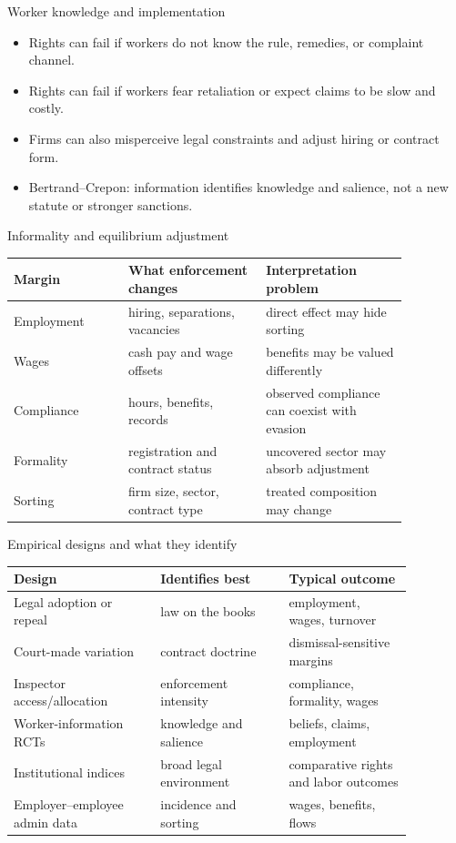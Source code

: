 \documentclass[aspectratio=169,11pt]{beamer}
\begin{document}
\begin{frame}{Worker knowledge and implementation}
\begin{itemize}
    \item Rights can fail if workers do not know the rule, remedies, or complaint channel.
    \item Rights can fail if workers fear retaliation or expect claims to be slow and costly.
    \item Firms can also misperceive legal constraints and adjust hiring or contract form.
    \item Bertrand--Crepon: information identifies knowledge and salience, not a new statute or stronger sanctions.
\end{itemize}
\end{frame}

\begin{frame}{Informality and equilibrium adjustment}
\small
\begin{tabular}{p{0.25\linewidth} p{0.30\linewidth} p{0.31\linewidth}}
\toprule
Margin & What enforcement changes & Interpretation problem \\
\midrule
Employment & hiring, separations, vacancies & direct effect may hide sorting \\
Wages & cash pay and wage offsets & benefits may be valued differently \\
Compliance & hours, benefits, records & observed compliance can coexist with evasion \\
Formality & registration and contract status & uncovered sector may absorb adjustment \\
Sorting & firm size, sector, contract type & treated composition may change \\
\bottomrule
\end{tabular}
\end{frame}

\begin{frame}{Empirical designs and what they identify}
\small
\begin{tabular}{p{0.32\linewidth} p{0.28\linewidth} p{0.27\linewidth}}
\toprule
Design & Identifies best & Typical outcome \\
\midrule
Legal adoption or repeal & law on the books & employment, wages, turnover \\
Court-made variation & contract doctrine & dismissal-sensitive margins \\
Inspector access/allocation & enforcement intensity & compliance, formality, wages \\
Worker-information RCTs & knowledge and salience & beliefs, claims, employment \\
Institutional indices & broad legal environment & comparative rights and labor outcomes \\
Employer--employee admin data & incidence and sorting & wages, benefits, flows \\
\bottomrule
\end{tabular}
\end{frame}
\end{document}
